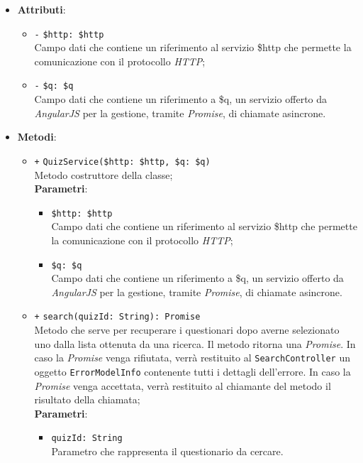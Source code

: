 \begin{itemize}
\begin{itemize}
	\end{itemize}
	\item \textbf{Attributi}:
	\begin{itemize}
		\item \texttt{-} \texttt{\$http: \$http} \\ Campo dati che contiene un riferimento al servizio \$http che permette la comunicazione con il protocollo \textit{HTTP};
		\item \texttt{-} \texttt{\$q: \$q} \\ Campo dati che contiene un riferimento a \$q, un servizio offerto da \textit{AngularJS} per la gestione, tramite \textit{Promise}, di chiamate asincrone.
	\end{itemize}
	\item \textbf{Metodi}: 
	\begin{itemize}
		\item \texttt{+} \texttt{QuizService(\$http: \$http, \$q: \$q)} \\ Metodo costruttore della classe; \\
		\textbf{Parametri}:
		\begin{itemize}
			\item \texttt{\$http: \$http} \\ Campo dati che contiene un riferimento al servizio \$http che permette la comunicazione con il protocollo \textit{HTTP};
			\item \texttt{\$q: \$q} \\ Campo dati che contiene un riferimento a \$q, un servizio offerto da \textit{AngularJS} per la gestione, tramite \textit{Promise}, di chiamate asincrone. 
		\end{itemize}
	\item \texttt{+} \texttt{search(quizId: String): Promise} \\Metodo che serve per recuperare i questionari dopo averne selezionato uno dalla lista ottenuta da una ricerca. Il metodo ritorna una \textit{Promise}. In caso la \textit{Promise} venga rifiutata, verrà restituito al \texttt{SearchController} un oggetto \texttt{ErrorModelInfo} contenente tutti i dettagli dell'errore. In caso la \textit{Promise} venga accettata, verrà restituito al chiamante del metodo il risultato della chiamata;\\
	\textbf{Parametri}:
	\begin{itemize}
		\item \texttt{quizId: String} \\ Parametro che rappresenta il questionario da cercare.

\end{itemize}
\end{itemize}
\end{itemize}
